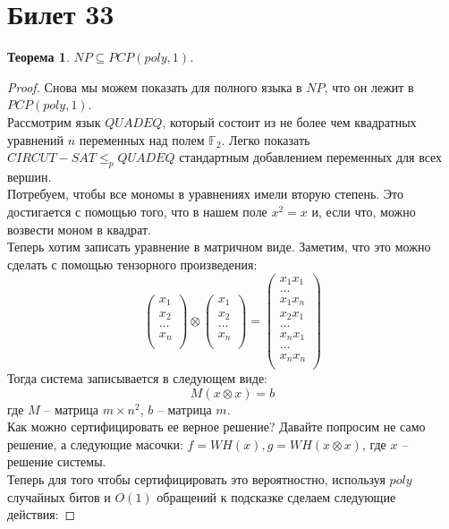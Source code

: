 \documentclass[12pt, letterpaper]{article}
\newtheorem{theorem}{Теорема}[section]
\newcommand{\leqp}{\leq_{p}}
\newcommand{\Ff}{\mathbb{F}}
\begin{document}
\section{Билет 33}
\begin{theorem}
$NP \subseteq PCP(poly, 1)$.
\end{theorem}
\begin{proof}
Снова мы можем показать для полного языка в $NP$, что он лежит в $PCP(poly, 1)$. \\
Рассмотрим язык $QUADEQ$, который состоит из не более чем квадратных уравнений $n$ переменных над полем $\Ff_2$. Легко показать $CIRCUT-SAT \leqp QUADEQ$ стандартным добавлением переменных для всех вершин. \\
Потребуем, чтобы все мономы в уравнениях имели вторую степень. Это достигается с помощью того, что в нашем поле $x^2=x$ и, если что, можно возвести моном в квадрат.\\
Теперь хотим записать уравнение в матричном виде. Заметим, что это можно сделать с помощью тензорного произведения: 
$$
\begin{pmatrix}
x_1 \\
x_2 \\
\ldots \\
x_n \\
\end{pmatrix}
\otimes 
\begin{pmatrix}
x_1 \\
x_2 \\
\ldots \\
x_n \\
\end{pmatrix}
=
\begin{pmatrix}
x_1 x_1 \\
\ldots \\
x_1 x_n \\
x_2 x_1 \\
\ldots \\
x_n x_1 \\
\ldots \\
x_n x_n \\
\end{pmatrix}
$$
Тогда система записывается в следующем виде:
$$M(x \otimes x) = b$$ где $M$ -- матрица $m \times n^2$, $b$ -- матрица $m$.\\
Как можно сертифицировать ее верное решение? Давайте попросим не само решение, а следующие масочки: $f = WH(x), g = WH(x \otimes x)$, где $x$ -- решение системы. \\
Теперь для того чтобы сертифицировать это вероятностно, используя $poly$ случайных битов и $O(1)$ обращений к подсказке сделаем следующие действия:

\end{proof}
\end{document}
